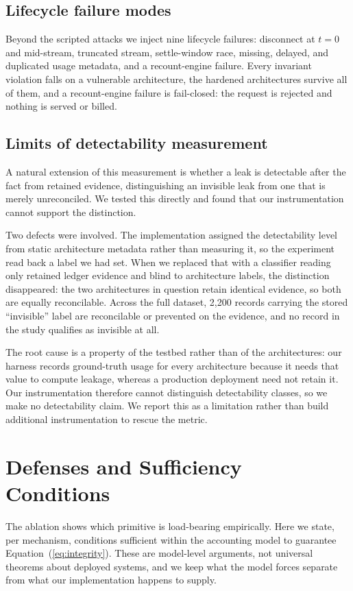 \documentclass[final,5p,times,twocolumn,number]{elsarticle}
\begin{document}
\subsection{Lifecycle failure modes}
Beyond the scripted attacks we inject nine lifecycle failures: disconnect at $t=0$ and
mid-stream, truncated stream, settle-window race, missing, delayed, and duplicated usage
metadata, and a recount-engine failure. Every invariant violation falls on a vulnerable
architecture, the hardened architectures survive all of them, and a recount-engine
failure is fail-closed: the request is rejected and nothing is served or billed.

\subsection{Limits of detectability measurement}
\label{sec:detect}
A natural extension of this measurement is whether a leak is detectable after the fact
from retained evidence, distinguishing an invisible leak from one that is merely
unreconciled. We tested this directly and found that our instrumentation cannot support
the distinction.

Two defects were involved. The implementation assigned the detectability level from
static architecture metadata rather than measuring it, so the experiment read back a
label we had set. When we replaced that with a classifier reading only retained ledger
evidence and blind to architecture labels, the distinction disappeared: the two
architectures in question retain identical evidence, so both are equally reconcilable.
Across the full dataset, 2{,}200 records carrying the stored ``invisible'' label are
reconcilable or prevented on the evidence, and no record in the study qualifies as
invisible at all.

The root cause is a property of the testbed rather than of the architectures: our
harness records ground-truth usage for every architecture because it needs that value to
compute leakage, whereas a production deployment need not retain it. Our instrumentation
therefore cannot distinguish detectability classes, so we make no detectability claim. We
report this as a limitation rather than build additional instrumentation to rescue the
metric.

\section{Defenses and Sufficiency Conditions}
\label{sec:sufficiency}
The ablation shows which primitive is load-bearing empirically. Here we state, per
mechanism, conditions sufficient within the accounting model to guarantee
Equation~(\ref{eq:integrity}). These are model-level arguments, not universal theorems
about deployed systems, and we keep what the model forces separate from what our
implementation happens to supply.
\end{document}
